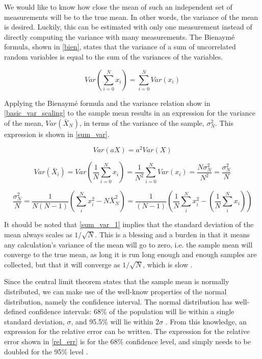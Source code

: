 We would like to know how close the mean of such an independent set of measurements will be to the true mean.  In other words, the variance of the mean is desired.  Luckily, this can be estimated with only one measurement instead of directly computing the variance with many measurements.  The Bienaym\'e formula, shown in \eqref{bien}, states that the variance of a sum of uncorrelated random variables is equal to the sum of the variances of the variables.

\begin{equation}
\label{bien}
Var\left(\sum_{i=0}^N x_i \right) = \sum_{i=0}^N Var(x_i)
\end{equation}      


Applying the Bienaym\'e formula and the variance relation show in \eqref{basic_var_scaling} to the sample mean results in an expression for the variance of the mean, $Var(\bar{X}_N)$, in terms of the variance of the sample, $\sigma_N^2$.  This expression is shown in \eqref{sum_var}.  

\begin{equation}
\label{basic_var_scaling}
Var\left(a X \right) = a^2 Var\left( X \right)
\end{equation}

\begin{equation}
\label{sum_var_1}
Var(\bar{X}_i) = Var\left(\frac{1}{N}\sum_{i=0}^N x_i \right) = \frac{1}{N^2} \sum_{i=0}^N Var(x_i) = \frac{N\sigma_N^2}{N^2} =  \frac{\sigma_N^2}{N} 
\end{equation}

\begin{equation}
\label{sum_var}
 \frac{\sigma_N^2}{N} = \frac{1}{N(N-1)} \left( \sum_i^N x_i^2- N\bar{X}_N^2 \right) = \frac{1}{(N-1)} \left( \frac{1}{N} \sum_i^N x_i^2 - \left(   \frac{1}{N} \sum_i^N x_i \right)   \right)
\end{equation}

It should be noted that \eqref{sum_var_1} implies that the standard deviation of the mean always scales as $1/\sqrt{N}$.  This is a blessing and a burden in that it means any calculation's variance of the mean will go to zero, i.e. the sample mean will converge to the true mean, as long it is run long enough and enough samples are collected, but that it will converge as $1/\sqrt{N}$, which is slow \cite{openmc}.

Since the central limit theorem states that the sample mean is normally distributed, we can make use of the well-know properties of the normal distribution, namely the confidence interval.  The normal distribution has well-defined confidence intervals: 68\% of the population will lie within a single standard deviation, $\sigma$, and 95.5\% will lie within $2\sigma$ \cite{jaakko}.  From this knowledge, an expression for the relative error can be written.  The expression for the relative error shown in \eqref{rel_err} is for the 68\% confidence level, and simply needs to be doubled for the 95\% level \cite{mcnp}.


